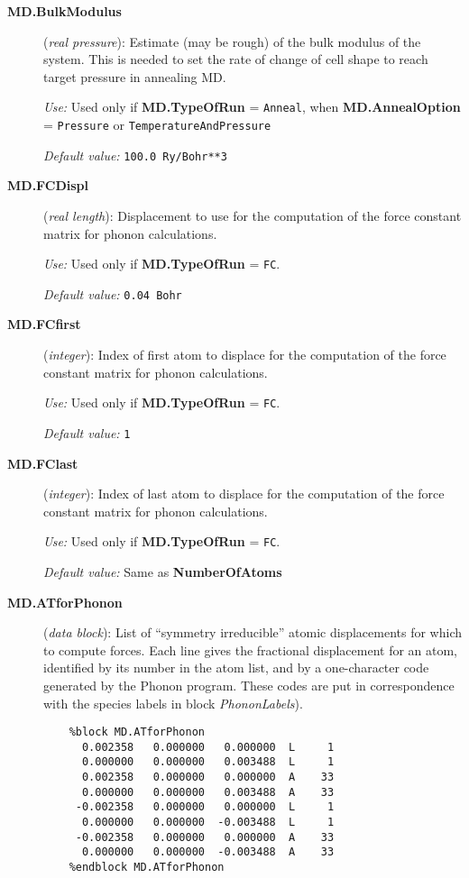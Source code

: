 \documentclass[11pt]{article}
\begin{document}
\begin{description}
\item[{\bf MD.BulkModulus}] ({\it real pressure}): 
Estimate (may be rough) of the bulk modulus of the system.
This is needed to set the rate of change of cell shape
to reach target pressure in annealing MD.

{\it Use:} Used only if {\bf MD.TypeOfRun} = {\tt Anneal}, when
{\bf MD.AnnealOption} = {\tt Pressure} or {\tt TemperatureAndPressure}

{\it Default value:}  {\tt 100.0 Ry/Bohr**3}
        
\item[{\bf MD.FCDispl}] ({\it real length}): 
Displacement to use for the computation of the force constant
matrix for phonon calculations.

{\it Use:} Used only if {\bf MD.TypeOfRun} = {\tt FC}.

{\it Default value:}  {\tt 0.04 Bohr}

\item[{\bf MD.FCfirst}] ({\it integer}): 
Index of first atom to displace for the computation of the force constant
matrix for phonon calculations.

{\it Use:} Used only if {\bf MD.TypeOfRun} = {\tt FC}.

{\it Default value:}  {\tt 1}

\item[{\bf MD.FClast}] ({\it integer}): 
Index of last atom to displace for the computation of the force constant
matrix for phonon calculations.

{\it Use:} Used only if {\bf MD.TypeOfRun} = {\tt FC}.

{\it Default value:}  Same as {\bf NumberOfAtoms}

\item[{\bf MD.ATforPhonon}] ({\it data block}): List of ``symmetry
irreducible'' atomic displacements for which to compute forces. Each
line gives the fractional displacement for an atom, identified by its
number in the atom list, and by a one-character code generated by the
{\sc Phonon} program. These codes are put in correspondence with the
species labels in block \hbox{\it PhononLabels}).

\begin{verbatim}
    %block MD.ATforPhonon
      0.002358   0.000000   0.000000  L     1
      0.000000   0.000000   0.003488  L     1
      0.002358   0.000000   0.000000  A    33
      0.000000   0.000000   0.003488  A    33
     -0.002358   0.000000   0.000000  L     1
      0.000000   0.000000  -0.003488  L     1
     -0.002358   0.000000   0.000000  A    33
      0.000000   0.000000  -0.003488  A    33
    %endblock MD.ATforPhonon
  

\end{verbatim}
\end{description}
\end{document}
